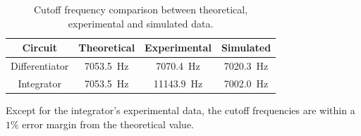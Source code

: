 		\begin{table}[htbp]
			\centering
			\caption{Cutoff frequency comparison between theoretical, experimental and simulated data.}
			\begin{tabular}{|c|c|c|c|}
				\hline
				\textbf{Circuit} & \textbf{Theoretical} & \textbf{Experimental} & \textbf{Simulated} \\
				\hline
				Differentiator & \SI{7053.5}{\hertz} & \SI{7070.4}{\hertz} & \SI{7020.3}{\hertz} \\
				\hline
				Integrator & \SI{7053.5}{\hertz} & \SI{11143.9}{\hertz} & \SI{7002.0}{\hertz} \\ 
				\hline
			\end{tabular}
			\label{tab:cutoff_frequency}
		\end{table}

		\noindent
		Except for the integrator's experimental data, the cutoff frequencies are within a $1 \%$ error margin from the theoretical value.